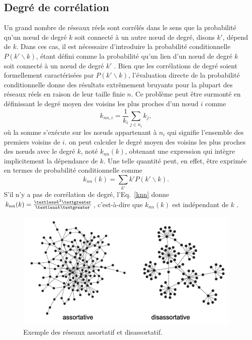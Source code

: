 \subsection{Degré de corrélation} 
Un grand nombre de réseaux réels sont corrélés dans le sens que la probabilité qu'un nœud de degré $k$ soit connecté à un autre
nœud de degré, disons $k'$, dépend de $k$. Dans ces cas, il est nécessaire d'introduire la probabilité conditionnelle 
$P(k'\backslash k)$, étant défini comme la probabilité qu'un lien d'un nœud de degré $k$ soit connecté à un nœud de degré 
$k'$ \cite{BP2002}. Bien que les corrélations de degré soient formellement caractérisées par $P(k'\backslash k)$, l'évaluation directe de la probabilité conditionnelle donne des résultats extrêmement bruyants pour la plupart des réseaux réels en raison de leur taille finie $n$. Ce problème peut être surmonté en définissant le degré moyen des voisins les plus proches d'un nœud $i$
comme
\begin{equation}
 k_{nn,i}=\frac{1}{k_i}\sum_{j\in n_i}k_j,
\end{equation}
où la somme s'exécute sur les nœuds appartenant à $n_i$ qui signifie l'ensemble des premiers voisins de $i$. on peut calculer le degré 
moyen des voisins les plus proches des nœuds avec le degré $k$, noté $k_{nn}(k)$, obtenant une expression qui intègre implicitement
la dépendance de $k$. Une telle quantité peut, en effet, être exprimée en termes de probabilité conditionnelle comme
\begin{equation}
 k_{nn}(k)=\sum_{k'}k'P(k'\backslash k).
 \label{knn}
\end{equation}
S'il n'y a pas de corrélation de degré, l'Eq.~\eqref{knn} donne
$k_{nn}(k)=\frac{\textless k^2\textgreater}{\textless k\textgreater}$, c'est-à-dire que $k_{nn}(k)$ est indépendant de $k$
\cite{Bo-al2006}.\\
\begin{figure}[h!]
	\centering
	\includegraphics[scale=0.6]{./figures/assortative_disassortative}
	\caption{Exemple des réseaux assortatif et disassortatif.}
	\label{assortative_disassortative}
\end{figure}
\label{s-correl}

